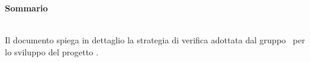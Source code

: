 \noindent\begin{Large}\textbf{Sommario}\end{Large}\\

\noindent 
Il documento spiega in dettaglio la strategia di verifica adottata dal gruppo \gruppo ~per lo sviluppo del progetto \progetto .\\